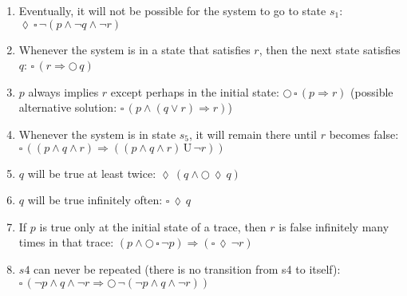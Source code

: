 \documentclass{article}
\def\unt{\, \text{U} \,}
\def\nex{\bigcirc \,}
\def\evt{\lozenge  \,}
\def\alw{\square \,}
\begin{document}
\begin{enumerate}
    \item Eventually, it will not be possible for the system to go to state $s_1$: $\evt \alw \lnot (p \land \lnot q \land \lnot r)$
    \item Whenever the system is in a state that satisfies $r$, then the next state satisfies $q$: $\alw (r \Rightarrow \nex q)$
    \item $p$ always implies $r$ except perhaps in the initial state: $\nex \alw (p \Rightarrow r)$ (possible alternative solution: $\alw(p \land (q \lor r)\Rightarrow r)$)
    \item Whenever the system is in state $s_5$, it will remain there until $r$ becomes false: $\alw ((p \land q \land r ) \Rightarrow ((p \land q \land r) \unt \lnot r) )$
    \item $q$ will be true at least twice: $\evt(q \land \nex \evt q)$
    \item $q$ will be true infinitely often: $\alw \evt q$
    \item If $p$ is true only at the initial state of a trace, then $r$ is false infinitely many times in that trace: $(p \land \nex\alw \lnot p) \Rightarrow (\alw \evt \lnot r)$
    \item $s4$ can never be repeated (there is no transition from s4 to itself): $\alw(\lnot p \land q \land \lnot r \Rightarrow \nex \lnot (\lnot p \land q \land \lnot r))$
\end{enumerate}
\end{document}
